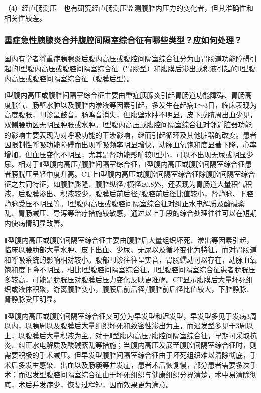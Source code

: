 （4）经直肠测压　也有研究经直肠测压监测腹腔内压力的变化者，但其准确性和相关性较差。

\subsubsection{重症急性胰腺炎合并腹腔间隔室综合征有哪些类型？应如何处理？}

国内有学者将重症胰腺炎后腹内高压或腹腔间隔室综合征分为由胃肠道功能障碍引起的Ⅰ型腹内高压或腹腔间隔室综合征（胃肠型）和腹膜后渗出或积液引起的Ⅱ型腹内高压或腹腔间隔室综合征（腹膜后型）。

Ⅰ型腹内高压或腹腔间隔室综合征主要由重症胰腺炎引起胃肠道功能障碍、胃肠高度胀气、肠壁水肿以及腹腔内渗液等因素引起，多发生在起病1～3日，临床表现为高度腹胀，叩诊呈鼓音，肠鸣音消失，但腹壁水肿不明显，皮下或脐周出血少见，双侧腰肋区无明显肿胀或水肿。Ⅰ型腹内高压或腹腔间隔室综合征对邻近脏器功能的影响主要表现为对呼吸功能的干涉影响，继而引起循环及其他脏器的改变。患者因限制性呼吸功能障碍而出现呼吸频率明显增快，动脉血氧饱和度显著下降，心率增加，但血压变化不明显，尤其是肾功能影响较Ⅱ型小，可以不出现无尿或明显少尿。相对于Ⅱ型腹内高压/腹腔间隔室综合征，Ⅰ型腹内高压或腹腔间隔室综合征患者膀胱压呈轻中度升高。CT上Ⅰ型腹内高压或腹腔间隔室综合征除腹腔间隔室综合征之共同特征，如腹腔膨隆、腹腔纵径/横径≥0.8外，还表现为胃肠道大量积气积液，后腹膜渗出、积液较少，腹膜后前后径/腹腔前后径比值较小，肾静脉、下腔静脉受压不明显等。Ⅰ型腹内高压或腹腔间隔室综合征对纠正水电解质及酸碱紊乱、胃肠减压、导泻等治疗措施较敏感，通过以上手段的综合处理往往可以在短期内使病情明显改善。

Ⅱ型腹内高压或腹腔间隔室综合征主要由腹腔后大量组织坏死、渗出等因素引起，临床以腰肋部大量水肿、皮下出血、少尿、无尿以及循环变化为特征，而对胃肠道和呼吸系统的影响相对较小。腹部叩诊往往呈实音，胃肠蠕动可以存在，动脉血氧饱和度下降不明显。相比Ⅰ型腹腔间隔室综合征，Ⅱ型腹腔间隔室综合征患者膀胱压多较高，可能是膀胱压对腹膜后压力变化反映更准确。CT显示腹膜后大量坏死组织或液体积聚，游离腹腔变小，腹膜后前后径/腹腔前后径比值较大，下腔静脉、肾静脉受压明显。

Ⅱ型腹内高压或腹腔间隔室综合征又可分为早发型和迟发型，早发型多见于发病3周以内，以胰周以及腹膜后大量组织坏死和致密性渗出为主，而迟发型多见于3周以上，以腹膜后大量积液为主。对于Ⅱ型腹内高压/腹腔间隔室综合征，早期可采取抗炎、纠正水电解质及酸碱紊乱等措施；当腹内高压发展至腹腔间隔室综合征时，则需要积极的手术减压。但早发型腹腔间隔室综合征由于坏死组织难以清除彻底，手术后多发生感染、出血以及肠瘘等并发症，患者术后恢复慢，部分患者需要多次手术；而迟发型腹腔间隔室综合征由于坏死组织与健康组织分界清楚，术中易清除彻底，术后并发症少，恢复过程短，因而效果更为满意。

